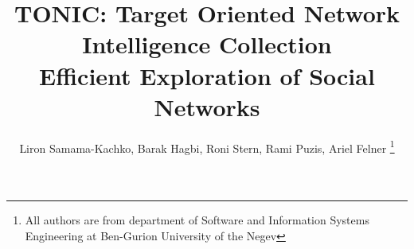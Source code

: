 \documentclass[journal]{IEEEtran}
\begin{document}
%
\title{TONIC: Target Oriented Network Intelligence Collection \\
{\large Efficient Exploration of Social Networks}}
%
%
%

\author{Liron Samama-Kachko, Barak Hagbi, Roni Stern, Rami Puzis,  Ariel Felner
\thanks{All authors are from department of Software and Information Systems Engineering at Ben-Gurion University of the Negev}
}



% 
%
\end{document}
